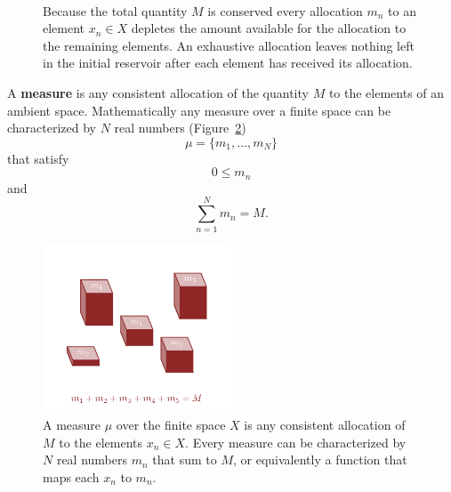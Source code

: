 \documentclass[
  letterpaper,
  DIV=11,
  numbers=noendperiod]{scrartcl}
\begin{document}
\begin{figure}
\begin{minipage}[t]{0.50\linewidth}
{{}

}

\subcaption{\label{fig-allocatione}}
\end{minipage}%
%
\begin{minipage}[t]{0.25\linewidth}

{\centering 

~

}

\end{minipage}%

\caption{\label{fig-allocation}Because the total quantity \(M\) is
conserved every allocation \(m_{n}\) to an element \(x_{n} \in X\)
depletes the amount available for the allocation to the remaining
elements. An exhaustive allocation leaves nothing left in the initial
reservoir after each element has received its allocation.}

\end{figure}

A \textbf{measure} is any consistent allocation of the quantity \(M\) to
the elements of an ambient space. Mathematically any measure over a
finite space can be characterized by \(N\) real numbers
(Figure~\ref{fig-measure}) \[
\mu = \{ m_{1}, \ldots, m_{N} \}
\] that satisfy \[
0 \le m_{n}
\] and \[
\sum_{n = 1}^{N} m_{n} = M.
\]

\begin{figure}

{\centering \includegraphics[width=0.5\textwidth,height=\textheight]{figures/measure/measure.pdf}

}

\caption{\label{fig-measure}A measure \(\mu\) over the finite space
\(X\) is any consistent allocation of \(M\) to the elements
\(x_{n} \in X\). Every measure can be characterized by \(N\) real
numbers \(m_{n}\) that sum to \(M\), or equivalently a function that
maps each \(x_{n}\) to \(m_{n}\).}

\end{figure}
\end{document}
